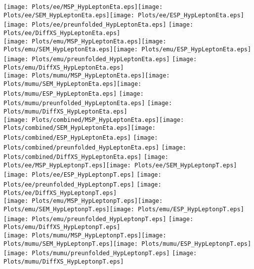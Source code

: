 \documentclass[a4paper,10pt]{article}
\begin{document}
\centering
\texttt{[image: Plots/ee/MSP\_HypLeptonEta.eps]}\texttt{[image: Plots/ee/SEM\_HypLeptonEta.eps]}\texttt{[image: Plots/ee/ESP\_HypLeptonEta.eps]} \texttt{[image: Plots/ee/preunfolded\_HypLeptonEta.eps]} \texttt{[image: Plots/ee/DiffXS\_HypLeptonEta.eps]}\\
\texttt{[image: Plots/emu/MSP\_HypLeptonEta.eps]}\texttt{[image: Plots/emu/SEM\_HypLeptonEta.eps]}\texttt{[image: Plots/emu/ESP\_HypLeptonEta.eps]} \texttt{[image: Plots/emu/preunfolded\_HypLeptonEta.eps]} \texttt{[image: Plots/emu/DiffXS\_HypLeptonEta.eps]}\\
\texttt{[image: Plots/mumu/MSP\_HypLeptonEta.eps]}\texttt{[image: Plots/mumu/SEM\_HypLeptonEta.eps]}\texttt{[image: Plots/mumu/ESP\_HypLeptonEta.eps]} \texttt{[image: Plots/mumu/preunfolded\_HypLeptonEta.eps]} \texttt{[image: Plots/mumu/DiffXS\_HypLeptonEta.eps]}\\
\texttt{[image: Plots/combined/MSP\_HypLeptonEta.eps]}\texttt{[image: Plots/combined/SEM\_HypLeptonEta.eps]}\texttt{[image: Plots/combined/ESP\_HypLeptonEta.eps]} \texttt{[image: Plots/combined/preunfolded\_HypLeptonEta.eps]} \texttt{[image: Plots/combined/DiffXS\_HypLeptonEta.eps]}
\newpage
\texttt{[image: Plots/ee/MSP\_HypLeptonpT.eps]}\texttt{[image: Plots/ee/SEM\_HypLeptonpT.eps]}\texttt{[image: Plots/ee/ESP\_HypLeptonpT.eps]} \texttt{[image: Plots/ee/preunfolded\_HypLeptonpT.eps]} \texttt{[image: Plots/ee/DiffXS\_HypLeptonpT.eps]}\\
\texttt{[image: Plots/emu/MSP\_HypLeptonpT.eps]}\texttt{[image: Plots/emu/SEM\_HypLeptonpT.eps]}\texttt{[image: Plots/emu/ESP\_HypLeptonpT.eps]} \texttt{[image: Plots/emu/preunfolded\_HypLeptonpT.eps]} \texttt{[image: Plots/emu/DiffXS\_HypLeptonpT.eps]}\\
\texttt{[image: Plots/mumu/MSP\_HypLeptonpT.eps]}\texttt{[image: Plots/mumu/SEM\_HypLeptonpT.eps]}\texttt{[image: Plots/mumu/ESP\_HypLeptonpT.eps]} \texttt{[image: Plots/mumu/preunfolded\_HypLeptonpT.eps]} \texttt{[image: Plots/mumu/DiffXS\_HypLeptonpT.eps]}\\
\end{document}
